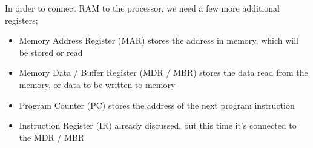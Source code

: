\documentclass[a4paper, 12pt]{article}
\begin{document}
            \begin{center}
            \end{center}
            In order to connect RAM to the processor, we need a few more additional registers;
            \begin{itemize}
                \itemsep0em
                \item Memory Address Register (MAR)
                    \subitem stores the address in memory, which will be stored or read
                \item Memory Data / Buffer Register (MDR / MBR)
                    \subitem stores the data read from the memory, or data to be written to memory
                \item Program Counter (PC)
                    \subitem stores the address of the next program instruction
                \item Instruction Register (IR)
                    \subitem already discussed, but this time it's connected to the MDR / MBR
            \end{itemize}

\end{document}
